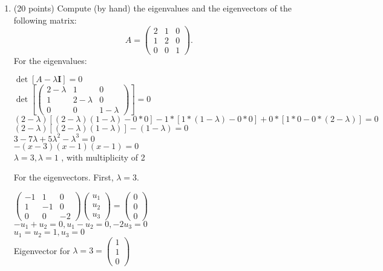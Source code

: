 \documentclass[11pt]{article}
\begin{document}
\begin{enumerate}
\item (20 points) Compute (by hand) the eigenvalues and the eigenvectors of the following matrix:
$$A = \begin{pmatrix} 2 & 1 & 0 \\ 1 & 2& 0\\ 0 & 0 & 1 \end{pmatrix}.$$
For the eigenvalues:
\begin{center}
      $\det[A - \lambda \mathbf{I} ] = 0$\\
      $\det[\begin{pmatrix} 2-\lambda & 1 & 0 \\ 1 & 2-\lambda& 0\\ 0 & 0 & 1-\lambda \end{pmatrix}] = 0$\\
      $(2-\lambda)[(2-\lambda)(1-\lambda) - 0*0] - 1*[1*(1-\lambda) - 0*0] + 0*[1*0 - 0*(2-\lambda)] = 0$\\
      $(2-\lambda)[(2-\lambda)(1-\lambda)] - (1-\lambda) = 0$\\
      $3 - 7\lambda + 5\lambda^2 - \lambda^3 = 0$\\
      $-(x-3)(x-1)(x-1) = 0$\\
      $\lambda = 3, \lambda = 1$ , with multiplicity of 2\\
\end{center}
For the eigenvectors. First, $\lambda = 3$.
\begin{center}
      $\begin{pmatrix} -1 & 1 & 0 \\ 1 & -1 & 0\\ 0 & 0 & -2 \end{pmatrix}  \begin{pmatrix} u_1  \\ u_2 \\ u_3 \end{pmatrix}= \begin{pmatrix} 0  \\ 0 \\ 0 \end{pmatrix}$\\
      $-u_1 + u_2 = 0, u_1-u_2 = 0, -2u_3 = 0$\\
      $u_1 = u_2 = 1, u_3 = 0$\\
      Eigenvector for $\lambda = 3 = \begin{pmatrix} 1  \\ 1 \\ 0 \end{pmatrix}$

\end{center}
\end{enumerate}
\end{document}
